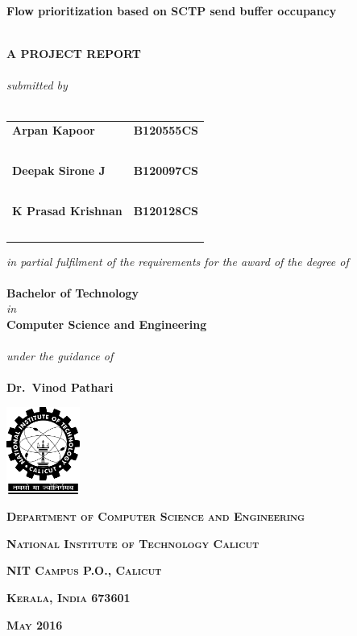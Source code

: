 \begin{titlepage}
  \centering

  {\large \textbf{Flow prioritization based on SCTP send buffer occupancy}\\~\\}

  \textbf{A PROJECT REPORT}\\~\\

  \emph{submitted by}\\~\\

  \begin{tabular}{lr}
    \textbf{Arpan Kapoor} & \textbf{B120555CS}\\~\\
    \textbf{Deepak Sirone J} & \textbf{B120097CS}\\~\\
    \textbf{K Prasad Krishnan} & \textbf{B120128CS}\\~\\
  \end{tabular}

  \medskip
  \emph{in partial fulfilment of the requirements for the award of the degree of}\\~\\

  \textbf{Bachelor of Technology}\\
  \emph{in}\\
  \textbf{Computer Science and Engineering}\\~\\

  \emph{under the guidance of}\\~\\

  \textbf{Dr.~Vinod Pathari}

  \vspace*{1in}
  \includegraphics[width=0.18\textwidth]{imgs/nitc-logo.png}

  {\large \textbf{\textsc{Department of Computer Science and Engineering}}\par}
  {\large \textbf{\textsc{National Institute of Technology Calicut}}\par}
  {\large \textbf{\textsc{NIT Campus P.O., Calicut}}\par}
  {\large \textbf{\textsc{Kerala, India 673601}}\par}

  {\textbf{\textsc{May 2016}}}
\end{titlepage}
